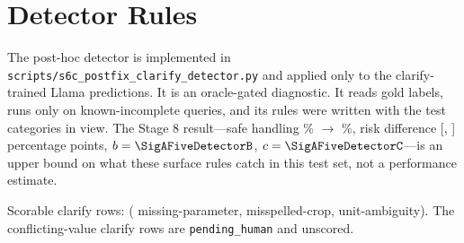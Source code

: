 \chapter{Detector Rules}
\label{app:F}
\label{app:detector}

The post-hoc detector is implemented in \texttt{scripts/s6c\_postfix\_clarify\_detector.py} and applied only to the clarify-trained Llama predictions. It is an oracle-gated diagnostic. It reads gold labels, runs only on known-incomplete queries, and its rules were written with the test categories in view. The Stage 8 result---safe handling \DetLearnedPct\% $\rightarrow$ \DetCombinedPct\%, risk difference \SigAFiveDetectorDiff{} [\SigAFiveDetectorDiffLo, \SigAFiveDetectorDiffHi] percentage points, $b = \SigAFiveDetectorB$, $c = \SigAFiveDetectorC$---is an upper bound on what these surface rules catch in this test set, not a performance estimate.

Scorable clarify rows: \TestClarify{} (\AdvMissingParamClarify{} missing-parameter, \AdvMisspelledClarify{} misspelled-crop, \AdvUnitAmbigClarify{} unit-ambiguity). The \TestExcludedConflict{} conflicting-value clarify rows are \texttt{pending\_human} and unscored.

